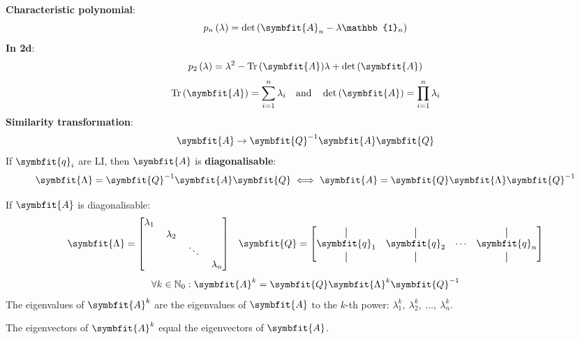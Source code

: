 \documentclass{article}
\begin{document}
\begin{minipage}[t]{126.1962963mm}
\begin{multicols*}{2}
        \textbf{Characteristic polynomial}:
        \begin{equation*}
            p_n\left(\lambda\right) = \det{\left( \symbfit{A}_n - \lambda\mathbb{1}_n \right)}
        \end{equation*}
        \textbf{In 2d}:
        \begin{equation*}
            p_2\left(\lambda\right) = \lambda^2-\tr{\left( \symbfit{A} \right)}\lambda + \det{\left( \symbfit{A} \right)}
        \end{equation*}
        \begin{equation*}
            \tr{\left( \symbfit{A} \right)} = \sum_{i=1}^n \lambda_i \quad \text{and} \quad
            \det{\left( \symbfit{A} \right)} = \prod_{i=1}^n \lambda_i
        \end{equation*}
        \textbf{Similarity transformation}:
        \begin{equation*}
            \symbfit{A}\rightarrow \symbfit{Q}^{-1}\symbfit{A}\symbfit{Q}
        \end{equation*}
        If \(\symbfit{q}_i\) are LI, then \(\symbfit{A}\) is
        \textbf{diagonalisable}:
        \begin{equation*}
            \symbfit{\Lambda}=\symbfit{Q}^{-1}\symbfit{A}\symbfit{Q} \iff \symbfit{A}=\symbfit{Q}\symbfit{\Lambda}\symbfit{Q}^{-1}
        \end{equation*}
    \end{multicols*}
    If \(\symbfit{A}\) is diagonalisable:
    \begin{equation*}
        \symbfit{\Lambda}=\mqty[\dmat{\lambda_1,\: \lambda_2,\: \ddots,\: \lambda_n}] \quad
        \symbfit{Q}=\mqty[\vertbar & \vertbar & & \vertbar \\ \symbfit{q}_1 &
            \symbfit{q}_2 & \cdots & \symbfit{q}_n \\ \vertbar & \vertbar & & \vertbar]
    \end{equation*}
    \begin{equation*}
        \forall k \in \mathbb{N}_0:\symbfit{A}^k = \symbfit{Q} \symbfit{\Lambda}^k \symbfit{Q}^{-1}
    \end{equation*}
    The eigenvalues of \(\symbfit{A}^k\) are the eigenvalues of \(\symbfit{A}\)
    to the \(k\)-th power: \(\lambda_1^k,\: \lambda_2^k,\: \dots,\: \lambda_n^k\).

    The eigenvectors of \(\symbfit{A}^k\) equal the eigenvectors of \(\symbfit{A}\).
\end{minipage}
\end{document}
